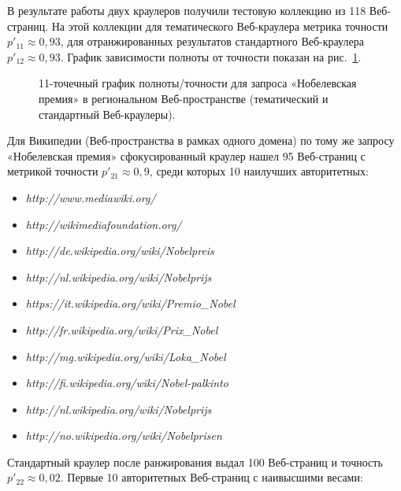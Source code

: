 В результате работы двух краулеров получили тестовую коллекцию из 118 Веб-страниц. На
этой коллекции для тематического Веб-краулера метрика точности \(p'_{11} \approx 0,93\), для отранжированных результатов стандартного Веб-краулера  \(p'_{12} \approx 0,93\). График зависимости полноты от точности показан на рис.~\cref{fig:nobelPrizeRegionalPR}.

\begin{figure}[ht]
	\caption{11-точечный график полноты/точности для запроса «Нобелевская премия» в региональном Веб-пространстве (тематический и стандартный Веб-краулеры).}\label{fig:nobelPrizeRegionalPR}
\end{figure}

Для Википедии (Веб-пространства в рамках одного домена) по тому же запросу «Нобелевская премия» сфокусированный краулер нашел 95 Веб-страниц с метрикой точности \(p'_{21} \approx 0,9\), среди которых 10 наилучших авторитетных:

\begin{itemize}
	\item \textit{http://www.mediawiki.org/}
	\item \textit{http://wikimediafoundation.org/}
	\item \textit{http://de.wikipedia.org/wiki/Nobelpreis}
	\item \textit{http://nl.wikipedia.org/wiki/Nobelprijs}
	\item \textit{https://it.wikipedia.org/wiki/Premio\_Nobel}
	\item \textit{http://fr.wikipedia.org/wiki/Prix\_Nobel}
	\item \textit{http://mg.wikipedia.org/wiki/Loka\_Nobel}
	\item \textit{http://fi.wikipedia.org/wiki/Nobel-palkinto} 
	\item \textit{http://nl.wikipedia.org/wiki/Nobelprijs}
	\item \textit{http://no.wikipedia.org/wiki/Nobelprisen}
\end{itemize}

Стандартный краулер после ранжирования выдал 100 Веб-страниц и точность \( p'_{22} \approx 0,02\). Первые 10 авторитетных Веб-страниц с наивысшими весами:

